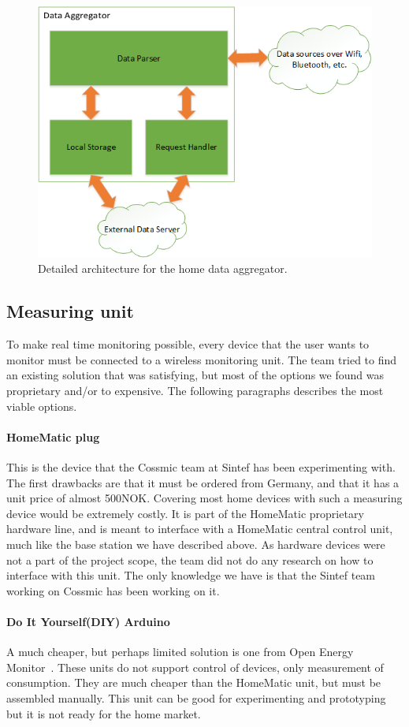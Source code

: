 \begin{figure}[H]
\centering
\includegraphics[height=0.4\textheight]{ch/further/fig/home.png}
\caption{Detailed architecture for the home data aggregator.}
\label{fig:aggregator}
\end{figure}

\subsection{Measuring unit}
To make real time monitoring possible, every device that the user wants to monitor must be connected to a wireless monitoring unit. The team tried to find an existing solution that was satisfying, but most of the options we found was proprietary and/or to expensive. The following paragraphs describes the most viable options.

\paragraph{HomeMatic plug}
This is the device that the Cossmic team at Sintef has been experimenting with. The first drawbacks are that it must be ordered from Germany, and that it has a unit price of almost 500NOK. Covering most home devices with such a measuring device would be extremely costly. It is part of the HomeMatic proprietary hardware line, and is meant to interface with a HomeMatic central control unit, much like the base station we have described above. As hardware devices were not a part of the project scope, the team did not do any research on how to interface with this unit. The only knowledge we have is that the Sintef team working on Cossmic has been working on it.

\paragraph{Do It Yourself(DIY) Arduino}
A much cheaper, but perhaps limited solution is one from Open Energy Monitor~\cite{oemmodule}. These units do not support control of devices, only measurement of consumption. They are much cheaper than the HomeMatic unit, but must be assembled manually. This unit can be good for experimenting and prototyping but it is not ready for the home market.